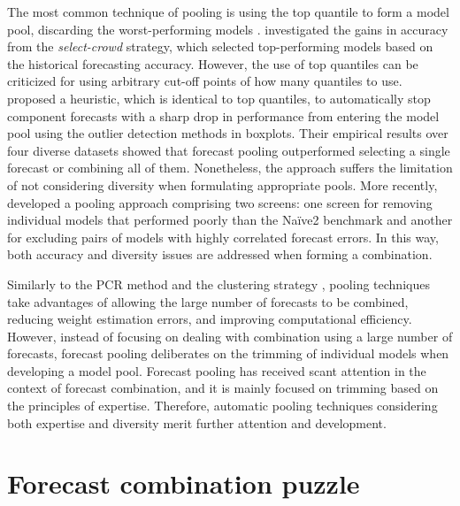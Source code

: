 \documentclass[11pt]{article}
\begin{document}
The most common technique of pooling is using the top quantile to form a model pool, discarding the worst-performing models \citep[e.g.,][]{Granger2004-sw}. \cite{Mannes2014-dl} investigated the gains in accuracy from the \textit{select-crowd} strategy, which selected top-performing models based on the historical forecasting accuracy. However, the use of top quantiles can be criticized for using arbitrary cut-off points of how many quantiles to use. \cite{Kourentzes2019-na} proposed a heuristic, which is identical to top quantiles, to automatically stop component forecasts with a sharp drop in performance from entering the model pool using the outlier detection methods in boxplots. Their empirical results over four diverse datasets showed that forecast pooling outperformed selecting a single forecast or combining all of them. Nonetheless, the approach suffers the limitation of not considering diversity when formulating appropriate pools. More recently, \cite{Lichtendahl2020-ut} developed a pooling approach comprising two screens: one screen for removing individual models that performed poorly than the Na\"{i}ve2 benchmark and another for excluding pairs of models with highly correlated forecast errors. In this way, both accuracy and diversity issues are addressed when forming a combination.

Similarly to the PCR method \citep{Stock2004-rq} and the clustering strategy \citep{Aiolfi2006-rh}, pooling techniques take advantages of allowing the large number of forecasts to be combined, reducing weight estimation errors, and improving computational efficiency. However, instead of focusing on dealing with combination using a large number of forecasts, forecast pooling deliberates on the trimming of individual models when developing a model pool. Forecast pooling has received scant attention in the context of forecast combination, and it is mainly focused on trimming based on the principles of expertise. Therefore, automatic pooling techniques considering both expertise and diversity merit further attention and development.

\section{Forecast combination puzzle}
\label{sec:forecast_combination_puzzle}
\end{document}
